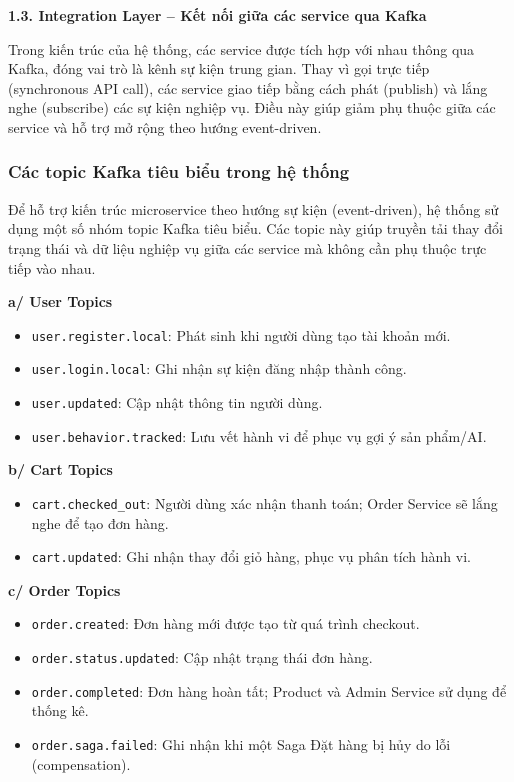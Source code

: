 \textbf{1.3. Integration Layer – Kết nối giữa các service qua Kafka}

Trong kiến trúc của hệ thống, các service được tích hợp với nhau thông qua Kafka, đóng vai trò là kênh sự kiện trung gian.
Thay vì gọi trực tiếp (synchronous API call), các service giao tiếp bằng cách phát (publish) và lắng nghe (subscribe) các sự kiện nghiệp vụ. Điều này giúp giảm phụ thuộc giữa các service và hỗ trợ mở rộng theo hướng event-driven.

\subsubsection{Các topic Kafka tiêu biểu trong hệ thống}

Để hỗ trợ kiến trúc microservice theo hướng sự kiện (event-driven), hệ thống sử dụng một số nhóm topic Kafka tiêu biểu. Các topic này giúp truyền tải thay đổi trạng thái và dữ liệu nghiệp vụ giữa các service mà không cần phụ thuộc trực tiếp vào nhau.

\textbf{a/ User Topics}
\begin{itemize}
    \item \texttt{user.register.local}: Phát sinh khi người dùng tạo tài khoản mới.
    \item \texttt{user.login.local}: Ghi nhận sự kiện đăng nhập thành công.
    \item \texttt{user.updated}: Cập nhật thông tin người dùng.
    \item \texttt{user.behavior.tracked}: Lưu vết hành vi để phục vụ gợi ý sản phẩm/AI.
\end{itemize}

\textbf{b/ Cart Topics}
\begin{itemize}
    \item \texttt{cart.checked\_out}: Người dùng xác nhận thanh toán; Order Service sẽ lắng nghe để tạo đơn hàng.
    \item \texttt{cart.updated}: Ghi nhận thay đổi giỏ hàng, phục vụ phân tích hành vi.
\end{itemize}

\textbf{c/ Order Topics}
\begin{itemize}
    \item \texttt{order.created}: Đơn hàng mới được tạo từ quá trình checkout.
    \item \texttt{order.status.updated}: Cập nhật trạng thái đơn hàng.
    \item \texttt{order.completed}: Đơn hàng hoàn tất; Product và Admin Service sử dụng để thống kê.
    \item \texttt{order.saga.failed}: Ghi nhận khi một Saga Đặt hàng bị hủy do lỗi (compensation).
\end{itemize}

